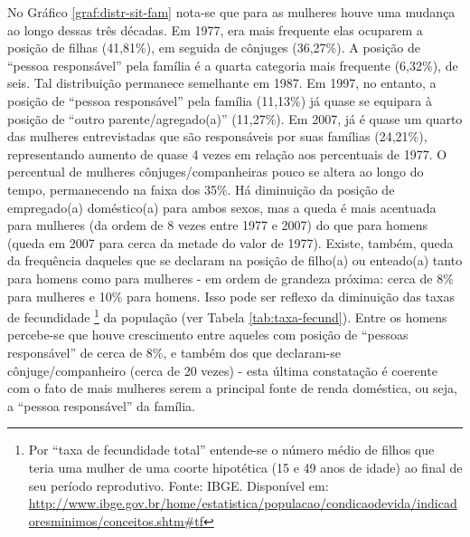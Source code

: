 \clearpage
No Gráfico \ref{graf:distr-sit-fam} nota-se que para as mulheres houve uma mudança ao longo dessas três décadas. Em 1977, era mais frequente elas ocuparem a posição de filhas (41,81\%), em seguida de cônjuges (36,27\%). A posição de ``pessoa responsável'' pela família é a quarta categoria mais frequente (6,32\%), de seis. Tal distribuição permanece semelhante em 1987. Em 1997, no entanto, a posição de ``pessoa responsável'' pela família (11,13\%) já quase se equipara à posição de ``outro parente/agregado(a)'' (11,27\%). Em 2007, já é quase um quarto das mulheres entrevistadas que são responsáveis por suas famílias (24,21\%), representando aumento de quase 4 vezes em relação aos percentuais de 1977. O percentual de mulheres cônjuges/companheiras pouco se altera ao longo do tempo, permanecendo na faixa dos 35\%. Há diminuição da posição de empregado(a) doméstico(a) para ambos sexos, mas a queda é mais acentuada para mulheres (da ordem de 8 vezes entre 1977 e 2007) do que para homens (queda em 2007 para cerca da metade do valor de 1977). Existe, também, queda da frequência daqueles que se declaram na posição de filho(a) ou enteado(a) tanto para homens como para mulheres - em ordem de grandeza próxima: cerca de 8\% para mulheres e 10\% para homens. Isso pode ser reflexo da diminuição das taxas de fecundidade%
\footnote{Por ``taxa de fecundidade total'' entende-se o número médio de filhos que teria uma mulher de uma coorte hipotética (15 e 49 anos de idade) ao final de seu período reprodutivo. Fonte: IBGE. Disponível em: \url{http://www.ibge.gov.br/home/estatistica/populacao/condicaodevida/indicadoresminimos/conceitos.shtm\#tf}} da população (ver Tabela \ref{tab:taxa-fecund}). Entre os homens percebe-se que houve crescimento entre aqueles com posição de ``pessoas responsável'' de cerca de 8\%, e também dos que declaram-se cônjuge/companheiro (cerca de 20 vezes) - esta última constatação é coerente com o fato de mais mulheres serem a principal fonte de renda doméstica, ou seja, a ``pessoa responsável'' da família.

